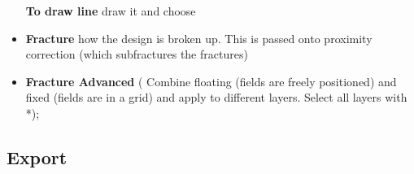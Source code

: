 \begin{itemize}
  \begin{framed}\noindent
    \textbf{To draw line }\newline draw it \ira {}
    and choose 
  \end{framed}

\item \textbf{Fracture} how the design  is broken up.  This is passed
  onto proximity correction (which subfractures the fractures)
\item   \textbf{Fracture   \iRa  Advanced}   \ira   ( Combine floating (fields  are freely positioned) and
  fixed (fields are in a grid)  and apply to different layers. Select
  all layers with *);
\end{itemize}
\subsection{Export}
